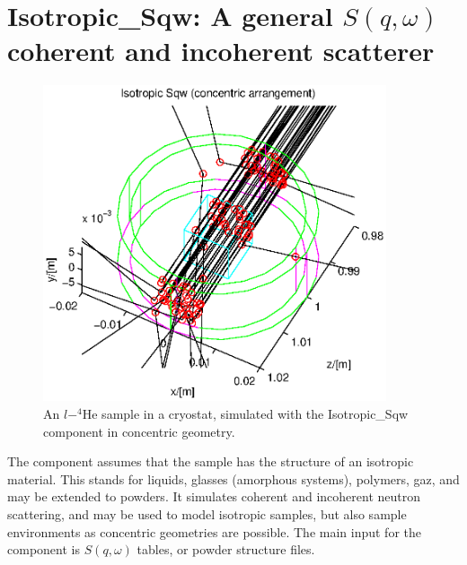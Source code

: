 \section{Isotropic\_Sqw: A general $S(q,\omega)$ coherent and incoherent scatterer}
\label{s:isotropic-sqw}


\begin{figure}
  \begin{center}
    \includegraphics[width=0.9\textwidth]{figures/sqw.eps}
  \end{center}
\caption{An $l-^4$He sample in a cryostat, simulated with the Isotropic\_Sqw component in concentric geometry.}
\label{f:isotropic-sqw}
\end{figure}

The component assumes that the sample has the structure of an isotropic material. This stands for liquids, glasses (amorphous systems), polymers, gaz, and may be extended to powders. It simulates coherent and incoherent neutron scattering, and may be used to model isotropic samples, but also sample environments as concentric geometries are possible. The main input for the component is $S(q,\omega)$ tables, or powder structure files.

